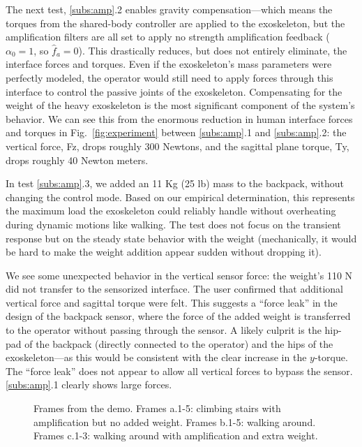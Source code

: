 \documentclass[utf8]{frontiersSCNS}
\begin{document}
The next test, \ref{subs:amp}.2 enables gravity compensation---which means the torques from the shared-body controller are applied to the exoskeleton, but the amplification filters are all set to apply no strength amplification feedback ($\alpha_0=1$, so $\widehat f_a=0$). This drastically reduces, but does not entirely eliminate, the interface forces and torques. Even if the exoskeleton's mass parameters were perfectly modeled, the operator would still need to apply forces through this interface to control the passive joints of the exoskeleton. Compensating for the weight of the heavy exoskeleton is the most significant component of the system's behavior. We can see this from the enormous reduction in human interface forces and torques in Fig.~\ref{fig:experiment} between \ref{subs:amp}.1 and \ref{subs:amp}.2: the vertical force, Fz, drops roughly 300 Newtons, and the sagittal plane torque, Ty, drops roughly 40 Newton meters.

In test \ref{subs:amp}.3, we added an 11 Kg (25 lb) mass to the backpack, without changing the control mode. Based on our empirical determination, this represents the maximum load the exoskeleton could reliably handle without overheating during dynamic motions like walking. The test does not focus on the transient response but on the steady state behavior with the weight (mechanically, it would be hard to make the weight addition appear sudden without dropping it).

We see some unexpected behavior in the vertical sensor force: the weight's 110 N did not transfer to the sensorized interface. The user confirmed that additional vertical force and sagittal torque were felt. This suggests a ``force leak'' in the design of the backpack sensor, where the force of the added weight is transferred to the operator without passing through the sensor. A likely culprit is the hip-pad of the backpack (directly connected to the operator) and the hips of the exoskeleton---as this would be consistent with the clear increase in the $y$-torque. The ``force leak'' does not appear to allow all vertical forces to bypass the sensor. \ref{subs:amp}.1 clearly shows large forces.

\begin{figure}[t]%
	\centering\footnotesize
	\resizebox{.9\textwidth}{!}{}
	\caption{Frames from the demo. Frames a.1-5: climbing stairs with amplification but no added weight. Frames b.1-5: walking around. Frames c.1-3: walking around with amplification and extra weight.}\label{fig:demo}
\end{figure}
\end{document}
